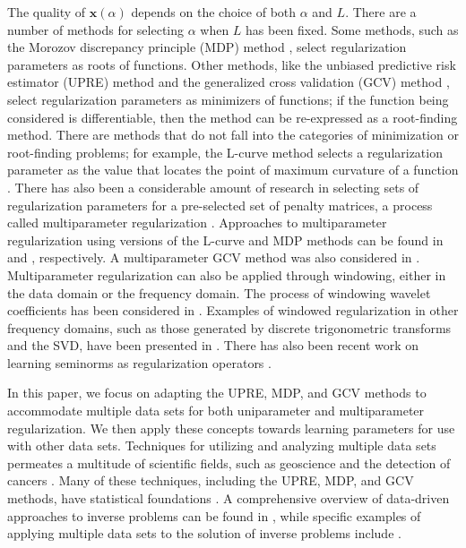 \documentclass[12pt]{article}
\newcommand{\xVec}{\mathbf{x}}	%
\newcommand{\regparam}{\alpha}  %
\newcommand{\xReg}{\xVec(\regparam)}	%
\begin{document}
The quality of $\xReg$ depends on the choice of both $\regparam$ and $L$. There are a number of methods for selecting $\regparam$ when $L$ has been fixed. Some methods, such as the Morozov discrepancy principle (MDP) method \cite{Morozov1966}, select regularization parameters as roots of functions. Other methods, like the unbiased predictive risk estimator (UPRE) method \cite{Mallows1973} and the generalized cross validation (GCV) method \cite{Wahba1977,Wahba1990}, select regularization parameters as minimizers of functions; if the function being considered is differentiable, then the method can be re-expressed as a root-finding method. There are methods that do not fall into the categories of minimization or root-finding problems; for example, the L-curve method selects a regularization parameter as the value that locates the point of maximum curvature of a function \cite{Hansen1992,HansenOLeary}. There has also been a considerable amount of research in selecting sets of regularization parameters for a pre-selected set of penalty matrices, a process called multiparameter regularization \cite{Brezinski2003,ChungEspanol2017,GazzolaNovati2013,LuPereverzev2011,Wood2002}. Approaches to multiparameter regularization using versions of the L-curve and MDP methods can be found in \cite{BelgeKilmerMiller2002} and \cite{Wang2012}, respectively. A multiparameter GCV method was also considered in \cite{ModarresiGolub1,ModarresiGolub2}. Multiparameter regularization can also be applied through windowing, either in the data domain or the frequency domain. The process of windowing wavelet coefficients has been considered in \cite{EasleyLabatePatel,StephanakisKollias}. Examples of windowed regularization in other frequency domains, such as those generated by discrete trigonometric transforms and the SVD, have been presented in \cite{ChungEasleyOLeary,ChungKilmerOLeary,KalkeSiltanen}. There has also been recent work on learning seminorms as regularization operators \cite{Holler2020LearningNR}. \par 
In this paper, we focus on adapting the UPRE, MDP, and GCV methods to accommodate multiple data sets for both uniparameter and multiparameter regularization. We then apply these concepts towards learning parameters for use with other data sets. Techniques for utilizing and analyzing multiple data sets permeates a multitude of scientific fields, such as geoscience \cite{GeoscienceML,Zobitz2020EfficientHD} and the detection of cancers \cite{MedicineML}. Many of these techniques, including the UPRE, MDP, and GCV methods, have statistical foundations \cite{StatLearning}. A comprehensive overview of data-driven approaches to inverse problems can be found in \cite{Arridge2019SolvingIP}, while specific examples of applying multiple data sets to the solution of inverse problems include \cite{ChungChungOLeary2011,ChungEspanol2017,HaberTenorio2003,KunischPock2013,TaroudakiOLeary2015,Learning2005}. \par 
\end{document}
